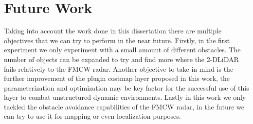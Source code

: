 \section{Future Work}
Taking into account the work done in this dissertation there are multiple objectives that we can try to perform in the near future. Firstly, in the first experiment we only experiment with a small amount of different obstacles. The number of objects can be expanded to try and find more where the 2-D\ac{LiDAR} fails relatively to the \ac{FMCW} \ac{radar}. Another objective to take in mind is the further improvement of the plugin costmap layer proposed in this work, the parameterization and optimization may be key factor for the successful use of this layer to combat unstructured dynamic environments. Lastly in this work we only tackled the obstacle avoidance capabilities of the \ac{FMCW} \ac{radar}, in the future we can try to use it for mapping or even localization purposes.

